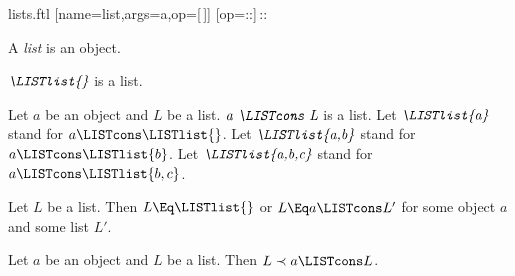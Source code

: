 \documentclass{stex}
\begin{document}
\begin{smodule}{lists.ftl}
[name=list,args=a,op=[\,]]{}
[op=::]{\,{::}\,}

\begin{signature}[forthel,for=LISTlist]
  A \emph{list} is an object.
\end{signature}

\begin{signature}[forthel,for=LISTlist]
  $\emph{\LISTlist{}}$ is a list.
\end{signature}

\begin{signature}[forthel,for=LISTlist]
  Let $a$ be an object and $L$ be a list.
  $\emph{a \LISTcons L}$ is a list.
  Let $\emph{\LISTlist{a}}$ stand for $a \LISTcons \LISTlist{}$.
  Let $\emph{\LISTlist{a,b}}$ stand for $a \LISTcons \LISTlist{b}$.
  Let $\emph{\LISTlist{a,b,c}}$ stand for $a \LISTcons \LISTlist{b,c}$.
\end{signature}

\begin{axiom}[forthel,for=LISTlist]
  Let $L$ be a list.
  Then $L \Eq \LISTlist{}$ or $L \Eq a \LISTcons L'$ for some object $a$ and some list $L'$.
\end{axiom}

\begin{axiom}[forthel,for=LISTlist]
  Let $a$ be an object and $L$ be a list.
  Then $L \prec a \LISTcons L$.
\end{axiom}
\end{smodule}
\end{document}
